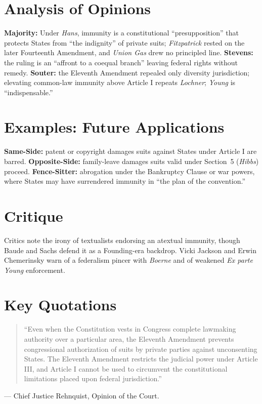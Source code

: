 \documentclass[12pt]{article}
\begin{document}
\section{Analysis of Opinions}
\textbf{Majority:} Under \textit{Hans}, immunity is a constitutional ``presupposition'' that protects States from ``the indignity'' of private suits; \textit{Fitzpatrick} rested on the later Fourteenth Amendment, and \textit{Union Gas} drew no principled line. \textbf{Stevens:} the ruling is an ``affront to a coequal branch'' leaving federal rights without remedy. \textbf{Souter:} the Eleventh Amendment repealed only diversity jurisdiction; elevating common-law immunity above Article I repeats \textit{Lochner}; \textit{Young} is ``indispensable.''

\section{Examples: Future Applications}
\textbf{Same-Side:} patent or copyright damages suits against States under Article I are barred. \textbf{Opposite-Side:} family-leave damages suits valid under Section~5 (\textit{Hibbs}) proceed. \textbf{Fence-Sitter:} abrogation under the Bankruptcy Clause or war powers, where States may have surrendered immunity in ``the plan of the convention.''

\section{Critique}
Critics note the irony of textualists endorsing an atextual immunity, though Baude and Sachs defend it as a Founding-era backdrop. Vicki Jackson and Erwin Chemerinsky warn of a federalism pincer with \textit{Boerne} and of weakened \textit{Ex parte Young} enforcement.

\section{Key Quotations}
\begin{quote}
``Even when the Constitution vests in Congress complete lawmaking authority over a particular area, the Eleventh Amendment prevents congressional authorization of suits by private parties against unconsenting States. The Eleventh Amendment restricts the judicial power under Article III, and Article I cannot be used to circumvent the constitutional limitations placed upon federal jurisdiction.''
\end{quote}
\noindent --- Chief Justice Rehnquist, Opinion of the Court.
\end{document}
